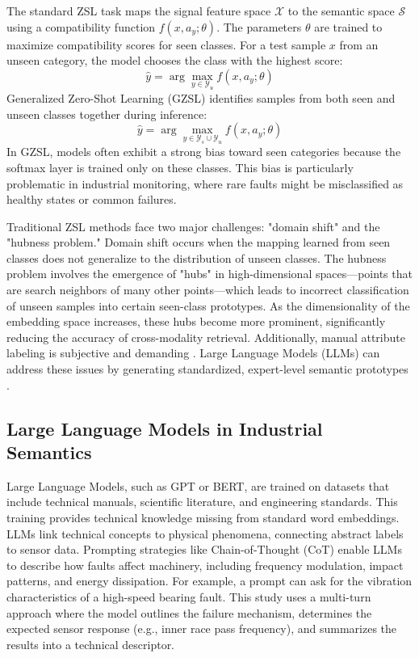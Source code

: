 The standard ZSL task maps the signal feature space $\mathcal{X}$ to the semantic space $\mathcal{S}$ using a compatibility function $f(x, a_y; \theta)$. The parameters $\theta$ are trained to maximize compatibility scores for seen classes. For a test sample $x$ from an unseen category, the model chooses the class with the highest score:
\begin{equation}
\hat{y} = \arg\max_{y \in \mathcal{Y}_u} f(x, a_y; \theta)
\end{equation}
Generalized Zero-Shot Learning (GZSL) identifies samples from both seen and unseen classes together during inference:
\begin{equation}
\hat{y} = \arg\max_{y \in \mathcal{Y}_s \cup \mathcal{Y}_u} f(x, a_y; \theta)
\end{equation}
In GZSL, models often exhibit a strong bias toward seen categories because the softmax layer is trained only on these classes. This bias is particularly problematic in industrial monitoring, where rare faults might be misclassified as healthy states or common failures.

Traditional ZSL methods face two major challenges: "domain shift" and the "hubness problem." Domain shift occurs when the mapping learned from seen classes does not generalize to the distribution of unseen classes. The hubness problem involves the emergence of "hubs" in high-dimensional spaces—points that are search neighbors of many other points—which leads to incorrect classification of unseen samples into certain seen-class prototypes. As the dimensionality of the embedding space increases, these hubs become more prominent, significantly reducing the accuracy of cross-modality retrieval. Additionally, manual attribute labeling is subjective and demanding \cite{palatucci2009zero, lampert2009learning}. Large Language Models (LLMs) can address these issues by generating standardized, expert-level semantic prototypes \cite{xian2018zero}.

\subsection{Large Language Models in Industrial Semantics}
Large Language Models, such as GPT or BERT, are trained on datasets that include technical manuals, scientific literature, and engineering standards. This training provides technical knowledge missing from standard word embeddings. LLMs link technical concepts to physical phenomena, connecting abstract labels to sensor data. Prompting strategies like Chain-of-Thought (CoT) enable LLMs to describe how faults affect machinery, including frequency modulation, impact patterns, and energy dissipation. For example, a prompt can ask for the vibration characteristics of a high-speed bearing fault. This study uses a multi-turn approach where the model outlines the failure mechanism, determines the expected sensor response (e.g., inner race pass frequency), and summarizes the results into a technical descriptor.

